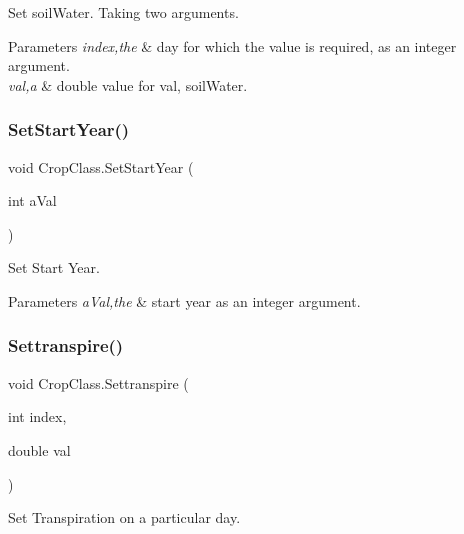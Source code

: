 Set soil\+Water. Taking two arguments. 


\begin{DoxyParams}{Parameters}
{\em index,the} & day for which the value is required, as an integer argument. \\
\hline
{\em val,a} & double value for val, soil\+Water. \\
\hline
\end{DoxyParams}
\mbox{\label{class_crop_class_a695a94a4096789748dfdc5a087480c43}} 
\subsubsection{\texorpdfstring{SetStartYear()}{SetStartYear()}}
{\footnotesize\ttfamily void Crop\+Class.\+Set\+Start\+Year (\begin{DoxyParamCaption}\item[{int}]{a\+Val }\end{DoxyParamCaption})\hspace{0.3cm}{\ttfamily [inline]}}



Set Start Year. 


\begin{DoxyParams}{Parameters}
{\em a\+Val,the} & start year as an integer argument. \\
\hline
\end{DoxyParams}
\mbox{\label{class_crop_class_a6f0cf7537a50f952860041afd264c656}} 
\subsubsection{\texorpdfstring{Settranspire()}{Settranspire()}}
{\footnotesize\ttfamily void Crop\+Class.\+Settranspire (\begin{DoxyParamCaption}\item[{int}]{index,  }\item[{double}]{val }\end{DoxyParamCaption})\hspace{0.3cm}{\ttfamily [inline]}}



Set Transpiration on a particular day. 


